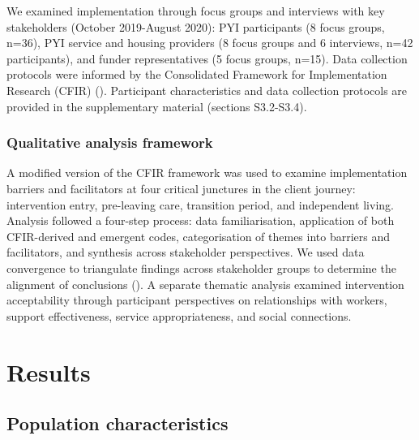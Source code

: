 \documentclass[
  jou,
  floatsintext,
  longtable,
  nolmodern,
  notxfonts,
  notimes,
  colorlinks=true,linkcolor=blue,citecolor=blue,urlcolor=blue]{apa7}
\begin{document}
We examined implementation through focus groups and interviews with key
stakeholders (October 2019-August 2020): PYI participants (8 focus
groups, n=36), PYI service and housing providers (8 focus groups and 6
interviews, n=42 participants), and funder representatives (5 focus
groups, n=15). Data collection protocols were informed by the
Consolidated Framework for Implementation Research (CFIR)
(). Participant characteristics and data collection
protocols are provided in the supplementary material (sections
S3.2-S3.4).

\subsubsection{Qualitative analysis
framework}\label{qualitative-analysis-framework}

A modified version of the CFIR framework was used to examine
implementation barriers and facilitators at four critical junctures in
the client journey: intervention entry, pre-leaving care, transition
period, and independent living. Analysis followed a four-step process:
data familiarisation, application of both CFIR-derived and emergent
codes, categorisation of themes into barriers and facilitators, and
synthesis across stakeholder perspectives. We used data convergence to
triangulate findings across stakeholder groups to determine the
alignment of conclusions
().
A separate thematic analysis examined intervention acceptability through
participant perspectives on relationships with workers, support
effectiveness, service appropriateness, and social connections.

\section{Results}\label{results}

\subsection{Population
characteristics}\label{population-characteristics}
\end{document}
